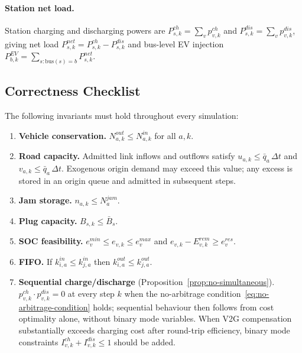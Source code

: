 \paragraph{Station net load.}
Station charging and discharging powers are
$P^{ch}_{s,k} = \sum_v p^{ch}_{v,k}$ and $P^{dis}_{s,k} = \sum_v p^{dis}_{v,k}$,
giving net load $P^{net}_{s,k} = P^{ch}_{s,k} - P^{dis}_{s,k}$ and
bus-level EV injection
$P^{EV}_{b,k} = \sum_{s:\mathrm{bus}(s)=b} P^{net}_{s,k}$.

\subsection{Correctness Checklist}
\label{sec:traffic-correctness}

The following invariants must hold throughout every simulation:

\begin{enumerate}
  \item \textbf{Vehicle conservation.} $N^{out}_{a,k} \le N^{in}_{a,k}$
        for all $a, k$.
  \item \textbf{Road capacity.} Admitted link inflows and outflows satisfy
        $u_{a,k} \le \bar{q}_a\,\Delta t$ and
        $v_{a,k} \le \bar{q}_a\,\Delta t$.  Exogenous origin demand may
        exceed this value; any excess is stored in an origin queue and
        admitted in subsequent steps.
  \item \textbf{Jam storage.} $n_{a,k} \le N^{jam}_a$.
  \item \textbf{Plug capacity.} $B_{s,k} \le \bar{B}_s$.
  \item \textbf{SOC feasibility.}
        $e^{min}_v \le e_{v,k} \le e^{max}_v$ and
        $e_{v,k} - E^{rem}_{v,k} \ge e^{res}_v$.
  \item \textbf{FIFO.} If $k^{in}_{i,a} \le k^{in}_{j,a}$ then
        $k^{out}_{i,a} \le k^{out}_{j,a}$.
  \item \textbf{Sequential charge/discharge}
        (Proposition~\ref{prop:no-simultaneous}).
        $p^{ch}_{v,k}\cdot p^{dis}_{v,k} = 0$ at every step $k$
        when the no-arbitrage condition~\eqref{eq:no-arbitrage-condition}
        holds; sequential behaviour then follows from cost optimality
        alone, without binary mode variables.  When V2G compensation
        substantially exceeds charging cost after round-trip efficiency,
        binary mode constraints $I^{ch}_{v,k}+I^{dis}_{v,k}\le 1$ should
        be added.
\end{enumerate}

